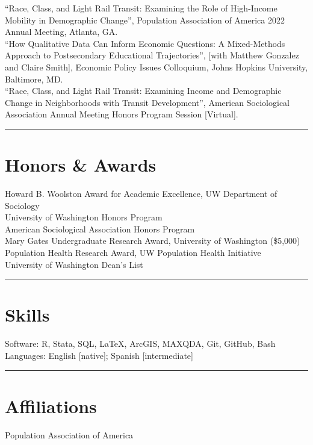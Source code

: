 \documentclass[11pt]{article} %
\begin{document}
   “Race, Class, and Light Rail Transit: Examining the Role of High-Income Mobility in Demographic Change”, Population Association of America 2022 Annual Meeting, Atlanta, GA. \\
 “How Qualitative Data Can Inform Economic Questions: A Mixed-Methods Approach to Postsecondary Educational Trajectories”, [with Matthew Gonzalez and Claire Smith], Economic Policy Issues Colloquium, Johns Hopkins University, Baltimore, MD. \\
   “Race, Class, and Light Rail Transit: Examining Income and Demographic Change in Neighborhoods with Transit Development”, American Sociological Association Annual Meeting Honors Program Session [Virtual]. \\
\noindent\rule{16cm}{0.4pt}
\section*{Honors \& Awards}
 Howard B. Woolston Award for Academic Excellence, UW Department of Sociology \\
 University of Washington Honors Program \\
 American Sociological Association Honors Program \\
 Mary Gates Undergraduate Research Award, University of Washington (\$5,000)	\\	
 Population Health Research Award, UW Population Health Initiative 	\\
 University of Washington Dean’s List \\					     
\noindent\rule{16cm}{0.4pt}

\section*{Skills}

Software: R, Stata, SQL, \LaTeX, ArcGIS, MAXQDA, Git, GitHub, Bash \\
Languages: English [native]; Spanish [intermediate] \\
\noindent\rule{16cm}{0.4pt}

\section*{Affiliations} 
Population Association of America
\end{document}

